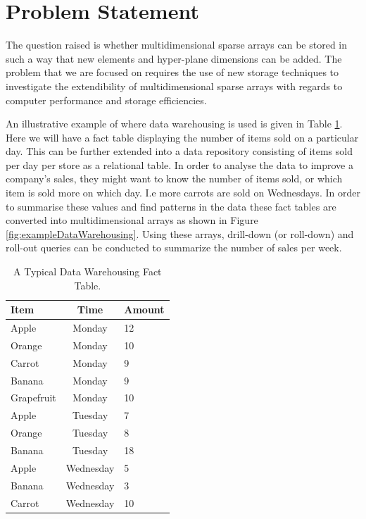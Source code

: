 \section{Problem Statement}
The question raised is whether multidimensional sparse arrays can be stored in such a way that new elements and hyper-plane dimensions can be added. The problem that we are focused on requires the use of new storage techniques to investigate the extendibility of multidimensional sparse arrays with regards to computer performance and storage efficiencies.

An illustrative example of where data warehousing is used is given in Table \ref{tab:example}. Here we will have a fact table displaying the number of items sold on a particular day. This can be further extended into a data repository consisting of items sold per day per store as a relational table. In order to analyse the data to improve a company's sales, they might want to know the number of items sold, or which item is sold more on which day. I.e more carrots are sold on Wednesdays. In order to summarise these values and find patterns in the data these fact tables are converted into multidimensional arrays as shown in Figure \ref{fig:exampleDataWarehousing}.  Using these arrays, drill-down (or roll-down) and roll-out queries can be conducted to summarize the number of sales per week.

\begin{table}[H]
	\caption{A Typical Data Warehousing Fact Table.\label{tab:example}}
	\begin{center}
		\begin{tabular}{p{26mm}cp{35mm}}
			\hline
			{\textbf{Item}} & {\textbf{Time}} & {\textbf{ Amount}}\\
			\hline
			Apple   & Monday & 12 \\
			Orange  & Monday & 10\\
			Carrot  & Monday & 9\\
			Banana  & Monday & 9\\
			Grapefruit & Monday & 10\\
			Apple   & Tuesday & 7 \\
			Orange  & Tuesday & 8 \\
			Banana	& Tuesday & 18 \\
			Apple   & Wednesday & 5 \\
			Banana  & Wednesday & 3\\
			Carrot  & Wednesday & 10\\
			\hline
		\end{tabular}
	\end{center}
\end{table}

